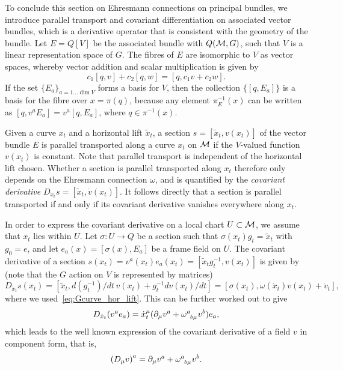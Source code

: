 \documentclass[
final,
11pt,
a4paper,
DIV=11,
headinclude=true,
footinclude=false,
bibliography=totoc,
twoside=true,  %
BCOR=5mm
]{scrbook}
\begin{document}
To conclude this section on Ehresmann connections on principal 
bundles, we introduce parallel transport and covariant 
differentiation on associated vector bundles, which is a 
derivative operator that is consistent with the geometry of the 
bundle. Let $E = Q[V]$ be the associated bundle with 
$Q(\mathcal{M},G)$, such that $V$ is a linear representation space of 
$G$. The fibres of $E$ are isomorphic to $V$ as vector spaces, 
whereby vector addition and scalar multiplication is given by
\begin{equation*}
  c_1[q,v] + c_2[q,w] = [q, c_1 v + c_2 w].
\end{equation*}
If the set ${\{E_a\}}_{a=1\ldots\dim V}$ forms a basis for $V$, 
then the collection $\{[q,E_a]\}$ is a basis for the fibre over 
$x = \pi(q)$, because any element $\pi_E^{-1}(x)$ can be written 
as $[q,v^a E_a] = v^a[q,E_a]$, where $q \in \pi^{-1}(x)$.

Given a curve $x_t$ and a horizontal lift $\tilde{x}_t$, a 
section $s = [\tilde{x}_t, v(x_t)]$ of the vector bundle $E$ is 
parallel transported along a curve $x_t$ on $\mathcal{M}$ if the 
$V$-valued function $v(x_t)$ is constant. Note that parallel 
transport is independent of the horizontal lift chosen. Whether a 
section is parallel transported along $x_t$ therefore only 
depends on the Ehresmann connection $\omega$, and is quantified 
by the \emph{covariant derivative} $D_{\dot{x}_t} s = 
[\tilde{x}_t, \dot{v}(x_t)]$. It follows directly that a section 
is parallel transported if and only if its covariant derivative 
vanishes everywhere along $x_t$.

In order to express the covariant derivative on a local chart $U 
\subset \mathcal{M}$, we assume that $x_t$ lies within $U$.  Let 
$\sigma : U \to Q$ be a section such that $\sigma(x_t)g_t 
= \tilde{x}_t$ with $g_0 = e$, and let $e_a(x) = [\sigma(x),E_a]$ 
be a frame field on $U$. The covariant derivative of a section 
$s(x_t) = v^a(x_t) e_a(x_t) = [\tilde{x}_t g_t^{-1}, v(x_t)]$ is 
given by (note that the $G$ action on $V$ is represented by 
matrices)
\begin{equation*}
  D_{\dot{x}_t} s(x_t)
  = [\tilde{x}_t, d(g^{-1}_t)/dt\, v(x_t) + g_t^{-1} dv(x_t)/dt]
  = [\sigma(x_t), \omega(\dot{x}_t)v(x_t) + \dot{v}_t],
\end{equation*}
where we used~\eqref{eq:Gcurve_hor_lift}. This can be further 
worked out to give
\begin{equation*}
  D_{\dot{x}_t} (v^a e_a) = \dot{x}_t^\mu ( \pd_\mu v^a + 
  \omega\ind{^a_{b\mu}}v^b) e_a,
\end{equation*}
which leads to the well known expression of the covariant 
derivative of a field $v$ in component form, that is,
\begin{equation}
\label{eq:cov_deriv_comp}
  {(D_\mu v)}^a = \pd_\mu v^a + \omega\ind{^a_{b\mu}}v^b.
\end{equation}
\end{document}
